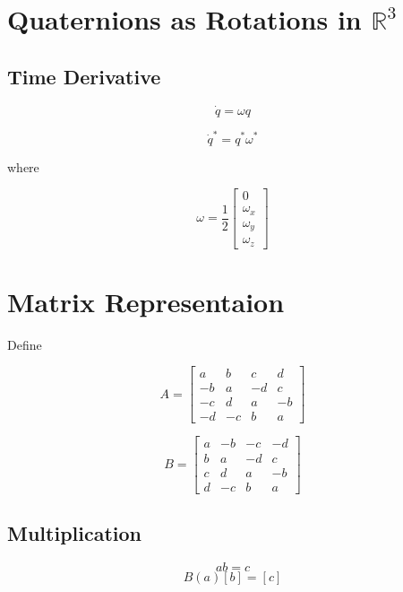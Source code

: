 \documentclass{article}
\begin{document}
\section{Quaternions as Rotations in $\mathbb{R}^3$}

\subsection{Time Derivative}

\[
\dot{q} = \omega q
\]

\[
\dot{q}^* = q^* \omega^*
\]

where

\[
\omega = \frac{1}{2}
\begin{bmatrix}
0 \\
\omega_x \\
\omega_y \\
\omega_z
\end{bmatrix}
\]








\section{Matrix Representaion}

Define

\[
A = \begin{bmatrix}
 a &  b &  c &  d \\
-b &  a & -d &  c \\
-c &  d &  a & -b \\
-d & -c &  b &  a
\end{bmatrix}
\]

\[
B = \begin{bmatrix}
 a & -b & -c & -d \\
 b &  a & -d &  c \\
 c &  d &  a & -b \\
 d & -c &  b &  a
\end{bmatrix}
\]

\subsection{Multiplication}

\[
ab = c
\]
\[
B(a) [b] = [c]
\]
\end{document}
